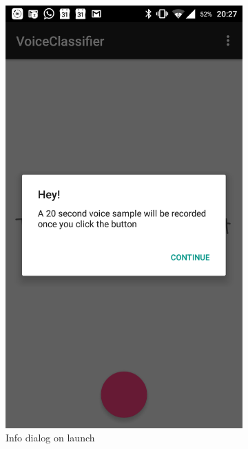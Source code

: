 \documentclass[letterpaper, 12 pt]{report}
\begin{document}
\begin{figure}[H]
\centering
\begin{subfigure}{.5\textwidth}
  \centering
  \includegraphics[width=.8\linewidth]{Photos/Opening_App.png}
  \caption{Info dialog on launch}
  \label{fig:sub1}
\end{subfigure}%
\begin{subfigure}{.5\textwidth}
  \centering

\end{subfigure}
\end{figure}
\end{document}
